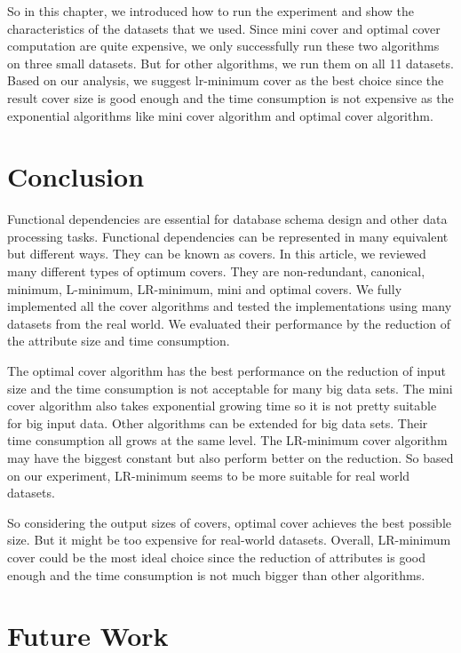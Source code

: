\documentclass[11pt]{book}
\begin{document}
So in this chapter, we introduced how to run the experiment and show the characteristics of the datasets that we used. Since mini cover and optimal cover computation are quite expensive, we only successfully run these two algorithms on three small datasets. But for other algorithms, we run them on all 11 datasets. Based on our analysis, we suggest lr-minimum cover as the best choice since the result cover size is good enough and the time consumption is not expensive as the exponential algorithms like mini cover algorithm and optimal cover algorithm.

\chapter{Conclusion}

Functional dependencies are essential for database schema design and other data processing tasks. Functional dependencies can be represented in many equivalent but different ways. They can be known as covers. In this article, we reviewed many different types of optimum covers. They are non-redundant, canonical, minimum, L-minimum, LR-minimum, mini and optimal covers. We fully implemented all the cover algorithms and tested the implementations using many datasets from the real world. We evaluated their performance by the reduction of the attribute size and time consumption.

The optimal cover algorithm has the best performance on the reduction of input size and the time consumption is not acceptable for many big data sets. The mini cover algorithm also takes exponential growing time so it is not pretty suitable for big input data. Other algorithms can be extended for big data sets. Their time consumption all grows at the same level. The LR-minimum cover algorithm may have the biggest constant but also perform better on the reduction. So based on our experiment, LR-minimum seems to be more suitable for real world datasets.

So considering the output sizes of covers, optimal cover achieves the best possible size. But it might be too expensive for real-world datasets. Overall, LR-minimum cover could be the most ideal choice since the reduction of attributes is good enough and the time consumption is not much bigger than other algorithms.

\chapter{Future Work}
\end{document}

